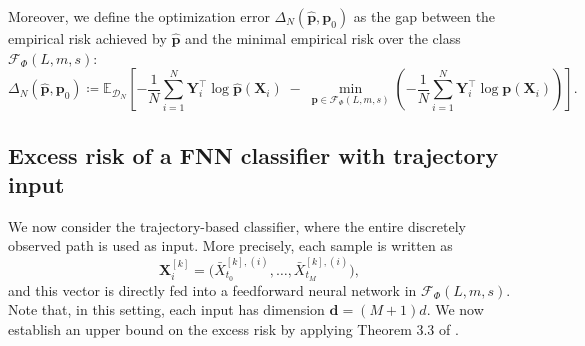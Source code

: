 \documentclass{article}
\theoremstyle{plain}
\theoremstyle{definition}
\theoremstyle{remark}
\begin{document}
Moreover, we define the optimization error $\Delta_N(\widehat{\mathbf{p}}, \mathbf{p}_0)$ as the gap between the empirical risk achieved by $\widehat{\mathbf{p}}$ and the minimal empirical risk over the class $\mathcal{F}_\Phi(L,m,s)$:
\[
\Delta_N(\widehat{\mathbf{p}}, \mathbf{p}_0)
\coloneqq
\mathbb{E}_{\mathcal{D}_N}\left[
-\frac{1}{N}\sum_{i=1}^N \mathbf{Y}_i^{\top} \log \widehat{\mathbf{p}}(\mathbf{X}_i)
\;-\;
\min_{\mathbf{p} \in \mathcal{F}_\Phi(L,m,s)}
\left(
-\frac{1}{N}\sum_{i=1}^N \mathbf{Y}_i^{\top} \log \mathbf{p}(\mathbf{X}_i)
\right)
\right].
\]




\subsection{Excess risk of a FNN classifier with trajectory input}\label{sec:bos-prop}

We now consider the trajectory-based classifier, where the entire discretely observed path is used as input. More precisely, each sample is written as  
\[
\mathbf{X}^{[k]}_i =
\big(
\bar X^{[k],(i)}_{t_0},
\dots,
\bar X^{[k],(i)}_{t_M}
\big),
\]
and this vector is directly fed into a feedforward neural network in $\mathcal{F}_\Phi(L,m,s)$. Note that, in this setting, each input has dimension \(\mathbf{d}=(M+1)d\). We now establish an upper bound on the excess risk by applying Theorem 3.3 of \citet{bos2022}.
\end{document}
